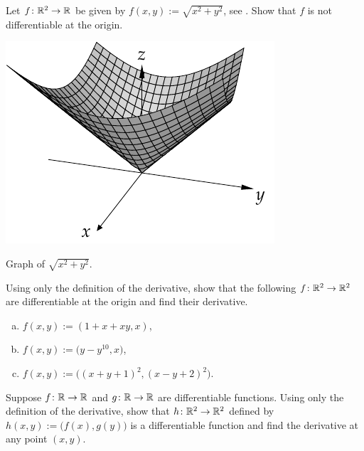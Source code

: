 \begin{exercise}
Let $f \colon {\mathbb{R}}^2 \to {\mathbb{R}}$ be given by
$f(x,y)
:=
\sqrt{x^2+y^2}$,
see .
Show that $f$ is not differentiable at the origin.
\end{exercise}

\begin{myfigureht}
\includegraphics{figures/distfromorgfunc}
\caption{Graph of $\sqrt{x^2+y^2}$.\label{fig:distfromorgfunc}}
\end{myfigureht}

\begin{samepage}
\begin{exercise}
Using only the definition of the derivative, show that
the following $f \colon {\mathbb{R}}^2 \to {\mathbb{R}}^2$ are differentiable at the origin and
find their derivative.
\begin{enumerate}[a)]
\item
$f(x,y) := (1+x+xy,x)$,
\item
$f(x,y) := \bigl(y-y^{10},x \bigr)$,
\item
$f(x,y) := \bigl( {(x+y+1)}^2 , {(x-y+2)}^2 \bigr)$.
\end{enumerate}
\end{exercise}
\end{samepage}

\begin{exercise}
Suppose $f \colon {\mathbb{R}} \to {\mathbb{R}}$ and $g \colon {\mathbb{R}} \to {\mathbb{R}}$ are differentiable
functions.  Using only the definition of the derivative, show that
$h \colon {\mathbb{R}}^2 \to {\mathbb{R}}^2$ defined by $h(x,y)
:= \bigl(f(x),g(y)\bigr)$ is a differentiable function and find the
derivative at any point $(x,y)$.
\end{exercise}


